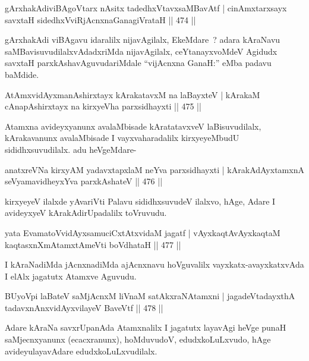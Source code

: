\begin{shl}
gArxhakAdiviBAgoV\s tarx nAsitx tadedhxVtavxsaMBavAtf |
cinAmxtarxsayx savxtaH sidedhxVviRjAcnxnaGanagiVrataH \hfill  || 474 ||
\end{shl}

\begin{artha}
gArxhakAdi viBAgavu idaralilx nijavAgilalx, EkeMdare~? adara kAraNavu saMBavisuvudilalxvAdadxriMda nijavAgilalx, ceYtanayxvoMdeV Agidudx savxtaH parxkAshavAguvudariMdale ``vijAcnxna GanaH:'' eMba padavu baMdide.
\end{artha}

\begin{shl}
AtAmxvidAyxmanAshirxtayx kArakatavxM na laBayxteV |
kArakaM cAnapAshirxtayx na kirxyeVha parxsidhayxti \hfill  || 475 ||
\end{shl}

\begin{artha}
Atamxna avideyxyanunx avalaMbisade kAratatavxveV laBisuvudilalx,
kArakavanunx avalaMbisade I vayxvaharadalilx kirxyeyeMbudU
sididhxsuvudilalx. adu heVgeMdare-
\end{artha}

\begin{shl}
anatxreVNa kirxyAM yadavxtapxlaM neYva parxsidhayxti |
kArakAdAyxtamxnA seVyamavidheyxYva parxkAshateV \hfill  || 476 ||
\end{shl}

\begin{artha}
kirxyeyeV ilalxde yAvariVti Palavu sididhxsuvudeV ilalxvo, hAge, Adare I avideyxyeV kArakAdirUpadalilx toVruvudu.
\end{artha}

\begin{shl}
yata EvamatoV\s vidAyxsamuciCxtAtxvidaM jagatf |
vAyxkaqtAvAyxkaqtaM kaqtasxnXmAtamxtAmeVti boVdhataH \hfill  || 477 ||
\end{shl}

\begin{artha}
I kAraNadiMda jAcnxnadiMda ajAcnxnavu hoVguvalilx vayxkatx-avayxkatxvAda I elAlx jagatutx Atamxve Aguvudu.
\end{artha}

\begin{shl}
BUyoV\s pi laBateV saMjAcnxM liVnaM satAkxraNAtamxni |
jagadeVtadayxthA tadavxnAnxvidAyxvilayeV BaveVtf \hfill  || 478 ||
\end{shl}

\begin{artha}
Adare kAraNa savxrUpanAda Atamxnalilx I jagatutx layavAgi heVge punaH saMjecnxyanunx (ecacxranunx), hoMduvudoV, edudxkoLuLxvudo, hAge avideyulayavAdare edudxkoLuLxvudilalx.
\end{artha}

